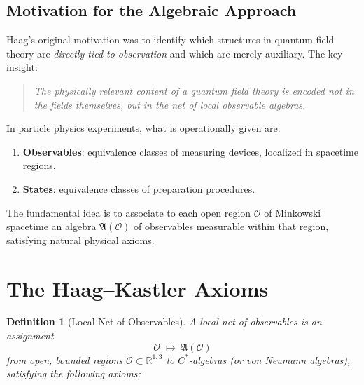 \documentclass[11pt,a4paper]{article}
\newtheorem{definition}{Definition}[section]
\begin{document}
\subsection{Motivation for the Algebraic Approach}

Haag's original motivation was to identify which structures in quantum field theory
are \emph{directly tied to observation} and which are merely auxiliary. The key insight:
\begin{quote}
\emph{The physically relevant content of a quantum field theory is encoded not in
the fields themselves, but in the net of local observable algebras.}
\end{quote}

In particle physics experiments, what is operationally given are:
\begin{enumerate}[nosep]
  \item \textbf{Observables}: equivalence classes of measuring devices, localized in
        spacetime regions.
  \item \textbf{States}: equivalence classes of preparation procedures.
\end{enumerate}

The fundamental idea is to associate to each open region $\mathcal{O}$ of
Minkowski spacetime an algebra $\mathfrak{A}(\mathcal{O})$ of observables
measurable within that region, satisfying natural physical axioms.

\section{The Haag--Kastler Axioms}

\begin{definition}[Local Net of Observables]
A \emph{local net of observables} is an assignment
\[
  \mathcal{O} \;\longmapsto\; \mathfrak{A}(\mathcal{O})
\]
from open, bounded regions $\mathcal{O}\subset\mathbb{R}^{1,3}$ to
$C^*$-algebras (or von Neumann algebras), satisfying the following axioms:
\end{definition}
\end{document}
